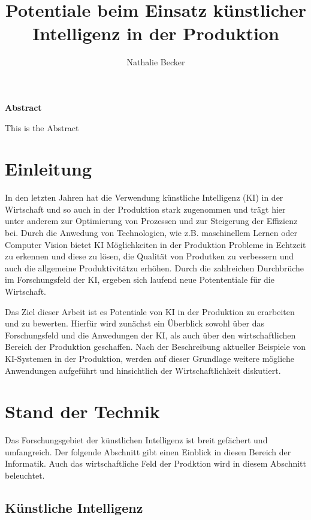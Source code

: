 \documentclass[a4paper,12pt, german]{report}
\begin{document}
\title{Potentiale beim Einsatz künstlicher Intelligenz in der Produktion}
\author{Nathalie Becker}


\begin{titlepage}
\maketitle
\end{titlepage}


\begin{center}
\textbf{Abstract}
\end{center}
This is the Abstract


\tableofcontents
\printacronyms

\chapter{Einleitung}
In den letzten Jahren hat die Verwendung künstliche Intelligenz (KI) in der Wirtschaft und so auch in der Produktion stark zugenommen und trägt hier unter anderem zur Optimierung von Prozessen und zur Steigerung der Effizienz bei. Durch die Anwedung von Technologien, wie z.B. maschinellem Lernen oder Computer Vision bietet KI Möglichkeiten in der Produktion Probleme in Echtzeit zu erkennen und diese zu lösen, die Qualität von Produtken zu verbessern und auch die allgemeine Produktivitätzu erhöhen. Durch die zahlreichen Durchbrüche im Forschungsfeld der KI, ergeben sich laufend neue Potententiale für die Wirtschaft. 

Das Ziel dieser Arbeit ist es Potentiale von KI in der Produktion zu erarbeiten und zu bewerten. Hierfür wird zunächst ein Überblick sowohl über das Forschungsfeld und die Anwedungen der KI, als auch über den wirtschaftlichen Bereich der Produktion geschaffen. Nach der Beschreibung aktueller Beispiele von KI-Systemen in der Produktion, werden auf dieser Grundlage weitere mögliche Anwendungen aufgeführt und hinsichtlich der Wirtschaftlichkeit diskutiert.  

\chapter{Stand der Technik}

Das Forschungsgebiet der künstlichen Intelligenz ist breit gefächert und umfangreich. Der folgende Abschnitt gibt einen Einblick in diesen Bereich der Informatik. Auch das wirtschaftliche Feld der Prodktion wird in diesem Abschnitt beleuchtet.

\section{Künstliche Intelligenz}
\end{document}
